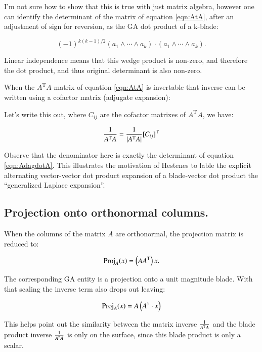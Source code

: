 \documentclass{article}      %
\newcommand{\transpose}[1]{{{#1}^{\text{T}}}}
\newcommand{\Det}[1] {\abs{#1}}
\begin{document}
I'm not sure how to show that this is true with just matrix algebra, however
one can identify the determinant of the matrix of equation \ref{eqn:AtA}, after an adjustment
of sign for reversion, as the GA dot product of a k-blade:

\begin{equation}\label{eqn:AdagdotA}
(-1)^{k(k-1)/2} (a_1 \wedge \cdots \wedge a_k) \cdot (a_1 \wedge \cdots \wedge a_k).
\end{equation}

Linear independence means that this wedge product is non-zero, and therefore the dot product, and thus original determinant is also non-zero.

When the $\transpose{A}A$ matrix of equation \ref{eqn:AtA} is invertable that inverse can be written using a cofactor matrix (adjugate expansion):

Let's write this out, where $C_{ij}$ are the cofactor matrixes of $\transpose{A}A$, we have:

\[
\inv{\transpose{A}A} = \inv{ \Det{ \transpose{A}A } } \transpose{[ C_{ij} ]}
\]

Observe that the denominator here is exactly the determinant of equation \ref{eqn:AdagdotA}.  This illustrates
the motivation of Hestenes to lable the explicit alternating vector-vector dot product expansion of a 
blade-vector dot product the ``generalized Laplace expansion''.


\subsection{ Projection onto orthonormal columns. }

When the 
columns of the matrix $A$ are orthonormal, the projection matrix is reduced to:

\[
\Proj_A(x) = \left( A \transpose{A} \right) x.
\]

The corresponding GA entity is a projection onto a unit magnitude blade.  With that scaling the inverse term also drops out leaving:

\[
\operatorname{Proj}_A(x) = A \left(A^\dagger \cdot x\right)
\]

This helps point out the similarity between the matrix inverse $\inv{\transpose{A}A}$ and the blade product inverse $\frac{1}{{A^\dagger}A}$ is only on the surface,
since this blade product is only a scalar.
\end{document}
